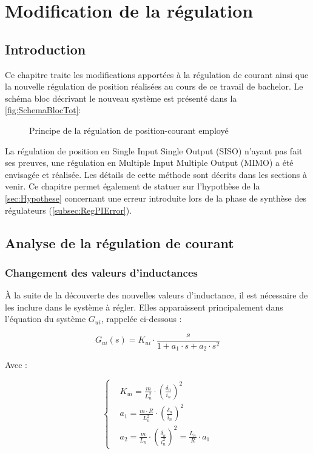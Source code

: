 \chapter{Modification de la régulation}

\section{Introduction}
Ce chapitre traite les modifications apportées à la régulation de courant ainsi que la nouvelle régulation de position réalisées au cours de ce travail de bachelor. Le schéma bloc décrivant le nouveau système est présenté dans la \autoref{fig:SchemaBlocTot}:

\begin{figure}[H]
    \centering
    
    \caption{Principe de la régulation de position-courant employé}
    \label{fig:SchemaBlocTot}
\end{figure}

La régulation de position en Single Input Single Output (SISO) n'ayant pas fait ses preuves, une régulation en Multiple Input Multiple Output (MIMO) a été envisagée et réalisée. Les détails de cette méthode sont décrits dans les sections à venir. Ce chapitre permet également de statuer sur l'hypothèse de la \autoref{sec:Hypothese} concernant une erreur introduite lors de la phase de synthèse des régulateurs (\autoref{subsec:RegPIError}).

\section{Analyse de la régulation de courant}

\subsection{Changement des valeurs d'inductances}
À la suite de la découverte des nouvelles valeurs d'inductance, il est nécessaire de les inclure dans le système à régler. Elles apparaissent principalement dans l'équation du système $G_{ui}$, rappelée ci-dessous :

\begin{equation}
    G_{ui}(s) = K_{ui}\cdot\frac{s}{1 + a_1 \cdot s + a_2\cdot s^2}
\end{equation}

Avec :

\begin{equation*}
    \left\{ \begin{aligned}
         & K_{ui} = \frac{m}{L_n^2}\cdot \left(\frac{\delta_n}{i_n} \right)^2                     \\
         & a_1 = \frac{m\cdot R}{L_n^2}\cdot \left(\frac{\delta_n}{i_n} \right)^2                 \\
         & a_2 = \frac{m}{L_n}\cdot\left(\frac{\delta_n}{i_n^2}\right)^2 = \frac{L_n}{R}\cdot a_1
    \end{aligned} \right.
\end{equation*}

